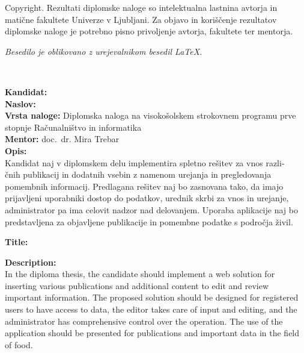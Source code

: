 \thispagestyle{empty}
\vspace*{8cm}

\noindent
{\sc Copyright}. 
Rezultati diplomske naloge so intelektualna lastnina avtorja in matične fakultete Univerze v Ljubljani.
Za objavo in koriščenje rezultatov diplomske naloge je potrebno pisno privoljenje avtorja, fakultete ter mentorja.

\begin{center}
\mbox{}\vfill
\emph{Besedilo je oblikovano z urejevalnikom besedil \LaTeX.}
\end{center}
\clearemptydoublepage

\thispagestyle{empty}
\
\vfill

\bigskip
\noindent\textbf{Kandidat:} \tauthor\\
\noindent\textbf{Naslov:} \ttitle\\
\noindent\textbf{Vrsta naloge:} Diplomska naloga na visokošolskem strokovnem programu
prve stopnje Računalništvo in informatika\\
\noindent\textbf{Mentor:} doc.\ dr.  Mira Trebar\\

\bigskip
\noindent\textbf{Opis:}\\
Kandidat naj v diplomskem delu implementira spletno rešitev za vnos razli-\\čnih publikacij in dodatnih vsebin z namenom urejanja in pregledovanja pomembnih informacij. Predlagana rešitev naj bo zasnovana tako, da imajo prijavljeni uporabniki dostop do podatkov, urednik skrbi za vnos in urejanje, administrator pa ima celovit nadzor nad delovanjem. Uporaba aplikacije naj bo predstavljena za objavljene publikacije in pomembne podatke s področja živil.

\bigskip
\noindent\textbf{Title:} \ttitleEn

\bigskip
\noindent\textbf{Description:}\\
In the diploma thesis, the candidate should implement a web solution for inserting various publications and additional content to edit and review important information. The proposed solution should be designed for registered users to have access to data, the editor takes care of input and editing, and the administrator has comprehensive control over the operation. The use of the application should be presented for publications and important data in the field of food.

